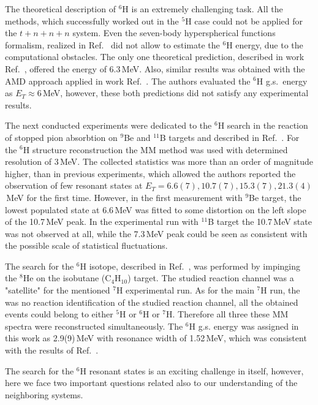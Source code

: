 The theoretical description of $^{6}$H is an extremely challenging task.
All the methods, which successfully worked out in the $^{5}$H case could not be applied for the $t+n+n+n$ system.
Even the seven-body hyperspherical functions formalism, realized in Ref.\ \cite{Timofeyuk:2002} did not allow to estimate the $^{6}$H energy, due to the computational obstacles.
The only one theoretical prediction, described in work Ref.\ \cite{Gorbatov:1989}, offered the energy of $6.3$\,MeV.
Also, similar results was obtained with the AMD approach applied in work Ref.\ \cite{Aoyama:2004}.
The authors evaluated the $^{6}$H g.s.\ energy as $E_{T} \approx 6$\,MeV, however, these both predictions did not satisfy any experimental results. 

The next conducted experiments were dedicated to the $^{6}$H search in the reaction of stopped pion absorbtion on $^{9}$Be and $^{11}$B targets and described in Ref.\ \cite{Gurov:2007}.
For the $^{6}$H structure reconstruction the MM method was used with determined resolution of 3\,MeV.
The collected statistics was more than an order of magnitude higher, than in previous experiments, which allowed the authors reported the observation of few resonant states at $E_T = {6.6(7), 10.7(7), 15.3(7), 21.3(4)}$\,MeV for the first time.
However, in the first measurement with $^{9}$Be target, the lowest populated state at 6.6\,MeV was fitted to some distortion on the left slope of the 10.7\,MeV peak.
In the experimental run with $^{11}$B target the 10.7\,MeV state was not observed at all, while the 7.3\,MeV peak could be seen as consistent with the possible scale of statistical fluctuations.

The search for the $^{6}$H isotope, described in Ref.\ \cite{Caamano:2008}, was performed by impinging the $^{8}$He on the isobutane (C$_{4}$H$_{10}$) target.
The studied reaction channel was a "satellite" for the mentioned $^{7}$H experimental run.
As for the main $^{7}$H run, the was no reaction identification of the studied reaction channel, all the obtained events could belong to either $^{5}$H or $^{6}$H or $^{7}$H.
Therefore all three these MM spectra were reconstructed simultaneously.
The $^{6}$H g.s. energy was assigned in this work as 2.9(9)\,MeV with resonance width of 1.52\,MeV, which was consistent with the results of Ref.\ \cite{Aleksandrov:1984,Belozyorov:1986}. 


The search for the $^{6}$H resonant states is an exciting challenge in itself, however, here we face two important questions related also to our understanding of the neighboring systems.

